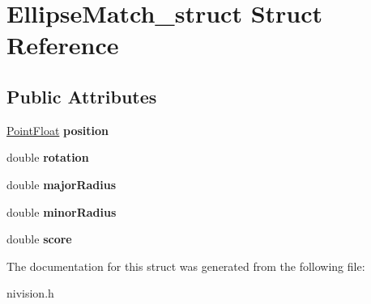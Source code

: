 \hypertarget{structEllipseMatch__struct}{\section{\-Ellipse\-Match\-\_\-struct \-Struct \-Reference}
\label{structEllipseMatch__struct}
}
\subsection*{\-Public \-Attributes}
\begin{DoxyCompactItemize}
\item 
\hypertarget{structEllipseMatch__struct_a5e0a4793f84bc9b0d029c968ca910311}{\hyperlink{structPointFloat__struct}{\-Point\-Float} {\bfseries position}}\label{structEllipseMatch__struct_a5e0a4793f84bc9b0d029c968ca910311}

\item 
\hypertarget{structEllipseMatch__struct_a665ff2c0e042b5941adc2df8b88943e8}{double {\bfseries rotation}}\label{structEllipseMatch__struct_a665ff2c0e042b5941adc2df8b88943e8}

\item 
\hypertarget{structEllipseMatch__struct_ab4730c5ab8911662de18ef06a7ed4592}{double {\bfseries major\-Radius}}\label{structEllipseMatch__struct_ab4730c5ab8911662de18ef06a7ed4592}

\item 
\hypertarget{structEllipseMatch__struct_af646e73f724fdfe86e783e3a3bbeacee}{double {\bfseries minor\-Radius}}\label{structEllipseMatch__struct_af646e73f724fdfe86e783e3a3bbeacee}

\item 
\hypertarget{structEllipseMatch__struct_a5557181c755b6ea9a94d24f399a16976}{double {\bfseries score}}\label{structEllipseMatch__struct_a5557181c755b6ea9a94d24f399a16976}

\end{DoxyCompactItemize}


\-The documentation for this struct was generated from the following file\-:\begin{DoxyCompactItemize}
\item 
nivision.\-h\end{DoxyCompactItemize}

